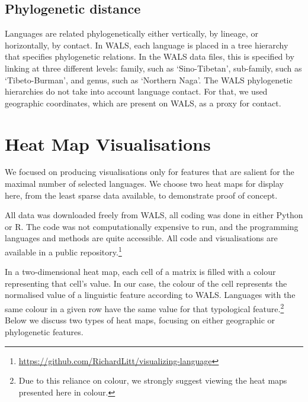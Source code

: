 \documentclass[11pt]{article}
\begin{document}
\subsection{Phylogenetic distance}

Languages are related phylogenetically either vertically, by lineage, or horizontally, by contact. In WALS, each language is placed in a tree hierarchy that specifies phylogenetic relations. In the WALS data files, this is specified by linking at three different levels: family, such as `Sino-Tibetan', sub-family, such as `Tibeto-Burman', and genus, such as `Northern Naga'. The WALS phylogenetic hierarchies do not take into account language contact. For that, we used geographic coordinates, which are present on WALS, as a proxy for contact. 


\section{Heat Map Visualisations}

We focused on producing visualisations only for features that are salient for the maximal number of selected languages. We choose two heat maps for display here, from the least sparse data available, to demonstrate proof of concept. 


All data was downloaded freely from WALS, all coding was done in either Python or R. The code was not computationally expensive to run, and the programming languages and methods are quite accessible. All code and visualisations are available in a public repository.\footnote{\url{https://github.com/RichardLitt/visualizing-language}}

In a two-dimensional heat map, each cell of a matrix is filled with a colour representing that cell's value. In our case, the colour of the cell represents the normalised value of a linguistic feature according to WALS. Languages with the same colour in a given row have the same value for that typological feature.\footnote{Due to this reliance on colour, we strongly suggest viewing the heat maps presented here in colour.} Below we discuss two types of heat maps, focusing on either geographic or phylogenetic features.
\end{document}
